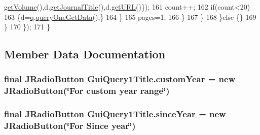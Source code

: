 \begin{DoxyCode}
      \hyperlink{classDataRecords_a6dfac293f0bd901eebf3a6ae17dc2513}{getVolume}(),d.\hyperlink{classDataRecords_add5c32b5a1511c42f70846fe08a4cfd7}{getJournalTitle}(),d.\hyperlink{classDataRecords_a40351f370945cfa624e1e3e1d6addc3e}{getURL}()\});
161                                         count++;
162                                         \textcolor{keywordflow}{if}(count<20)
163                                         \{d=\hyperlink{classGUIQuery_a2a20445d749185552014142b78f3e071}{q}.\hyperlink{classQueryFacade_adf9324b3f38765b2b6c1b4a64b301a11}{queryOneGetData}();\}    
164                                     \}
165                                     pages=1;
166                                 \}   
167                             \}
168                         \}\textcolor{keywordflow}{else} \{\}    
169                     \}
170             \});
171         \}   
\end{DoxyCode}


\subsection{Member Data Documentation}
\subsubsection[{\texorpdfstring{custom\+Year}{customYear}}]{\setlength{\rightskip}{0pt plus 5cm}final J\+Radio\+Button Gui\+Query1\+Title.\+custom\+Year = new J\+Radio\+Button(\char`\"{}For custom year range\char`\"{})\hspace{0.3cm}{\ttfamily [private]}}\hypertarget{classGuiQuery1Title_aa7c8f24ee5498bd7808133f52a585449}{}\label{classGuiQuery1Title_aa7c8f24ee5498bd7808133f52a585449}
\subsubsection[{\texorpdfstring{since\+Year}{sinceYear}}]{\setlength{\rightskip}{0pt plus 5cm}final J\+Radio\+Button Gui\+Query1\+Title.\+since\+Year = new J\+Radio\+Button(\char`\"{}For Since year\char`\"{})\hspace{0.3cm}{\ttfamily [private]}}\hypertarget{classGuiQuery1Title_a57f5240e22a35a95739062b91bdd4cba}{}\label{classGuiQuery1Title_a57f5240e22a35a95739062b91bdd4cba}
